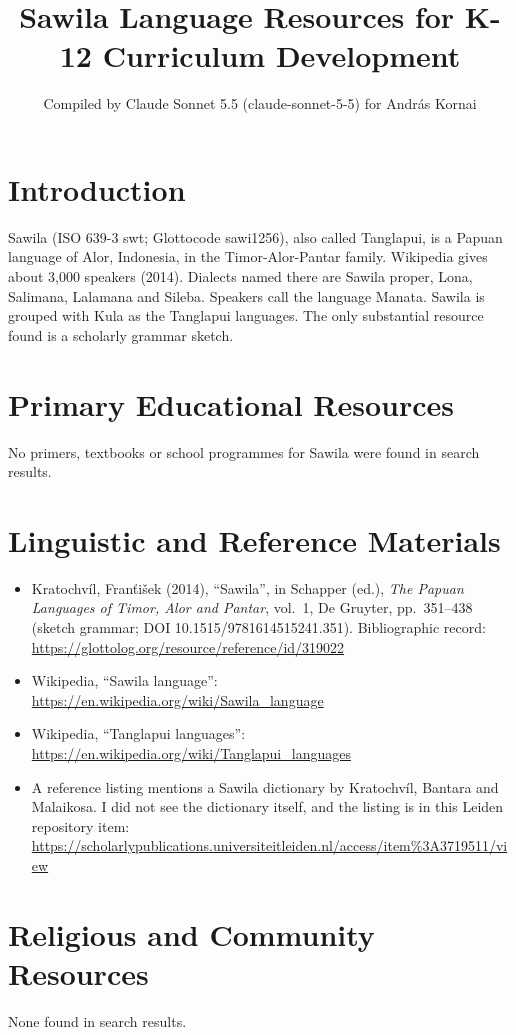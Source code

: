 \documentclass[12pt]{article}
\title{Sawila Language Resources for K-12 Curriculum Development}
\author{Compiled by Claude Sonnet 5.5 (claude-sonnet-5-5) for Andr\'as Kornai}
\date{}
\begin{document}
\maketitle

\section{Introduction}
Sawila (ISO 639-3 swt; Glottocode sawi1256), also called Tanglapui, is a Papuan language of Alor, Indonesia, in the Timor-Alor-Pantar family. Wikipedia gives about 3,000 speakers (2014). Dialects named there are Sawila proper, Lona, Salimana, Lalamana and Sileba. Speakers call the language Manata. Sawila is grouped with Kula as the Tanglapui languages. The only substantial resource found is a scholarly grammar sketch.

\section{Primary Educational Resources}
No primers, textbooks or school programmes for Sawila were found in search results.

\section{Linguistic and Reference Materials}
\begin{itemize}
\item Kratochv\'il, Fran\v{t}i\v{s}ek (2014), ``Sawila'', in Schapper (ed.), \emph{The Papuan Languages of Timor, Alor and Pantar}, vol.\ 1, De Gruyter, pp.\ 351--438 (sketch grammar; DOI 10.1515/9781614515241.351). Bibliographic record: \url{https://glottolog.org/resource/reference/id/319022}
\item Wikipedia, ``Sawila language'': \url{https://en.wikipedia.org/wiki/Sawila_language}
\item Wikipedia, ``Tanglapui languages'': \url{https://en.wikipedia.org/wiki/Tanglapui_languages}
\item A reference listing mentions a Sawila dictionary by Kratochv\'il, Bantara and Malaikosa. I did not see the dictionary itself, and the listing is in this Leiden repository item: \url{https://scholarlypublications.universiteitleiden.nl/access/item%3A3719511/view}
\end{itemize}

\section{Religious and Community Resources}
None found in search results.
\end{document}
